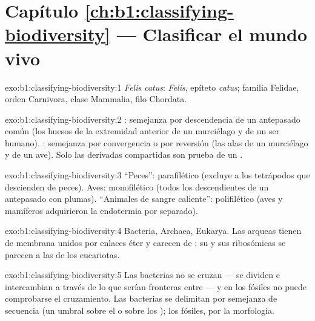 \section*{Capítulo \ref{ch:b1:classifying-biodiversity} --- Clasificar el mundo vivo}

\begin{solution}{exo:b1:classifying-biodiversity:1}
\emph{Felis catus}:  \emph{Felis}, epíteto \emph{catus}; familia
Felidae, orden Carnivora, clase Mammalia, filo Chordata.
\end{solution}

\begin{solution}{exo:b1:classifying-biodiversity:2}
: semejanza por descendencia de un antepasado común (los huesos de
la extremidad anterior de un murciélago y de un ser humano). :
semejanza por convergencia o por reversión (las alas de un murciélago y de
un ave). Solo las  derivadas compartidas son prueba de un .
\end{solution}

\begin{solution}{exo:b1:classifying-biodiversity:3}
``Peces'': parafilético (excluye a los tetrápodos que descienden de peces).
Aves: monofilético (todos los descendientes de un antepasado con plumas).
``Animales de sangre caliente'': polifilético (aves y mamíferos adquirieron
la endotermia por separado).
\end{solution}

\begin{solution}{exo:b1:classifying-biodiversity:4}
Bacteria, Archaea, Eukarya. Las arqueas tienen  de membrana unidos
por enlaces éter y carecen de ; su  y sus
 ribosómicas se parecen a las de los eucariotas.
\end{solution}

\begin{solution}{exo:b1:classifying-biodiversity:5}
Las bacterias no se cruzan --- se dividen e intercambian  a través de
lo que serían fronteras entre  --- y en los fósiles no puede
comprobarse el cruzamiento. Las bacterias se delimitan por semejanza de
secuencia (un umbral sobre el  o sobre los ); los
fósiles, por la morfología.
\end{solution}

